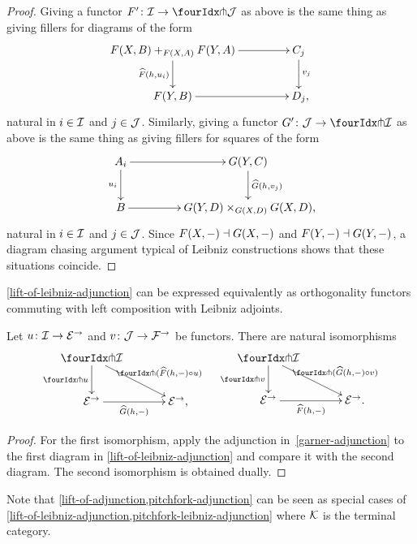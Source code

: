 \documentclass[reqno,10pt,a4paper,oneside,draft]{amsart}
\begin{document}
\begin{proof}
Giving a functor $F' \co \cal{I} \to \liftl{\cal{J}}$ as above is the same thing as giving fillers for diagrams of the form
\[
\xymatrix@C+2em{
  F(X,B) +_{F(X,A)} F(Y,A)
  \ar[d]_{\widehat{F}(h, u_i)}
  \ar[r]
&
  C_j
  \ar[d]^{v_j}
\\
  F(Y, B)
  \ar[r]
&
  D_j \rlap{,}
}
\]
natural in $i \in \cal{I}$ and $j \in \cal{J}$.
Similarly, giving a functor $G' \co \cal{J} \to \liftl{\cal{I}}$ as above is the same thing as giving fillers for squares of the form
\[
\xymatrix@C+2em{
  A_i
  \ar[d]_{u_i}
  \ar[r]
&
  G(Y, C)
  \ar[d]^{\widehat{G}(h, v_j)}
\\
  B
  \ar[r]
&
  G(Y,D) \times_{G(X,D)} G(X,D) \rlap{,}
}
\]
natural in $i \in \cal{I}$ and $j \in \cal{J}$.
Since $F(X, \arghole) \dashv G(X, \arghole)$ and $F(Y, \arghole) \dashv G(Y, \arghole)$, a diagram chasing argument typical of Leibniz constructions shows that these situations coincide.
\end{proof}

\cref{lift-of-leibniz-adjunction} can be expressed equivalently as orthogonality functors commuting with left composition with Leibniz adjoints.

\begin{corollary} \label{pitchfork-leibniz-adjunction}
Let $u \co \cal{I} \to \catE^\to$ and $v \co \cal{J} \to \cal{F}^\to$ be functors.
There are natural isomorphisms
\begin{align*}
\xymatrix@C+1em{
  \liftr{\cal{I}}
  \ar[dr]^-{\liftr{(\widehat{F}(h, -) \cc u)}}
  \ar[d]_-{\liftr{u}}
\\
  \catE^\to
  \ar[r]_-{\widehat{G}(h, -)}
&
  \catE^\to
\rlap{,}}
&&
\xymatrix@C+1em{
  \liftl{\cal{I}}
  \ar[d]_-{\liftl{v}}
  \ar[dr]^-{\liftl{(\widehat{G}(h, -) \cc v)}}
\\
  \catE^\to
  \ar[r]_-{\widehat{F}(h, -)}
&
  \catE^\to
\rlap{.}}
\end{align*}
\end{corollary}

\begin{proof}
For the first isomorphism, apply the adjunction in~\eqref{garner-adjunction} to the first diagram in \cref{lift-of-leibniz-adjunction} and compare it with the second diagram.
The second isomorphism is obtained dually.
\end{proof}

Note that \cref{lift-of-adjunction,pitchfork-adjunction} can be seen as special cases of \cref{lift-of-leibniz-adjunction,pitchfork-leibniz-adjunction} where $\cal{K}$ is the terminal category.
\end{document}
